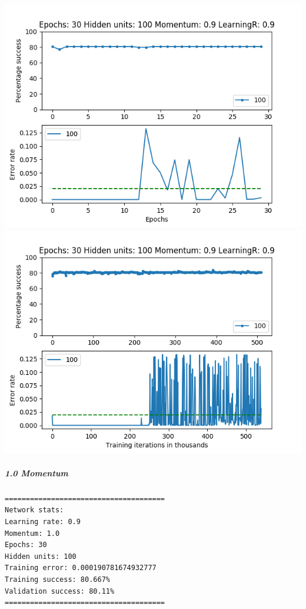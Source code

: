 \documentclass[11pt]{article}
\makeatletter
\def\maxwidth{\ifdim\Gin@nat@width>\linewidth\linewidth
    \else\Gin@nat@width\fi}
\let\Oldincludegraphics\includegraphics
\renewcommand{\includegraphics}[1]{\Oldincludegraphics[width=.8\maxwidth]{#1}}
\makeatother
\begin{document}
\includegraphics{Experiment2/E2_NN_Epoch_Momentum_0.9_30Epochs_100Hiddenunits.png}
\includegraphics{Experiment2/E2_NN_Training_Momentum_0.9_30Epochs_100Hiddenunits.png}

\hypertarget{momentum-10}{%
\subparagraph{1.0 Momentum}\label{momentum-10}}

\begin{verbatim}
======================================
Network stats: 
Learning rate: 0.9
Momentum: 1.0
Epochs: 30
Hidden units: 100
Training error: 0.000190781674932777
Training success: 80.667%
Validation success: 80.11%
======================================
\end{verbatim}
\end{document}
